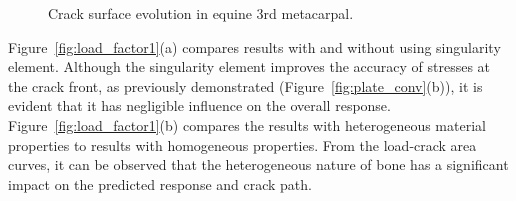 \documentclass[onecolumn]{svjour3}
\begin{document}
\begin{figure}[h!]
	\centering
	\begin{centering}
	\end{centering}		
		\caption{Crack surface evolution in equine 3rd metacarpal.}
		\label{fig:crack_snapshots}
\end{figure}
% 
% 
Figure~\ref{fig:load_factor1}(a) compares results with and without using singularity element. Although the singularity element improves the accuracy of stresses at the crack front, as previously demonstrated (Figure~\ref{fig:plate_conv}(b)), it is evident that it has negligible influence on the overall response. Figure~\ref{fig:load_factor1}(b) compares the results with heterogeneous material properties to results with homogeneous properties. From the load-crack area curves, it can be observed that the heterogeneous nature of bone has a significant impact on the predicted response and crack path. 
% 
\end{document}
